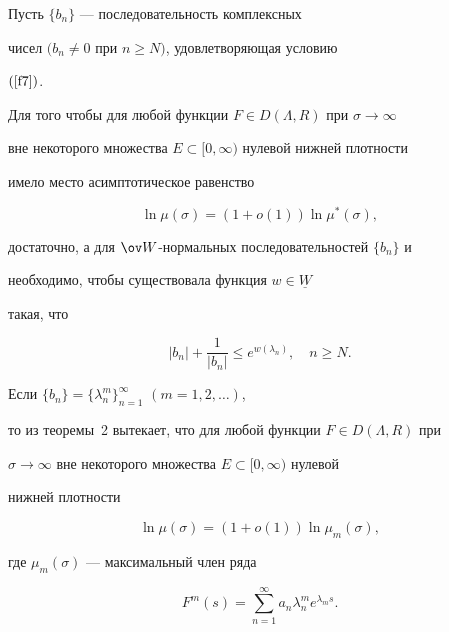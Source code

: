 \begin{thm}


Пусть $\{b_{n}\}$ --- последовательность комплексных


чисел $(b_{n}\neq0$ при $n\geq N)$, удовлетворяющая условию


$(\ref{f7})$.





Для того чтобы для любой функции $F\in D(\Lambda,R)$ при $\sigma\to\infty$


вне некоторого множества $E\subset[0,\infty)$ нулевой нижней плотности


имело место асимптотическое равенство


$$


\ln \mu(\sigma)=(1+o(1))\ln\mu^{*}(\sigma),


$$


достаточно, а для $\ov W$-нормальных последовательностей $\{b_n\}$ и


необходимо, чтобы существовала функция $w\in\underline{W}$


такая, что


\begin{equation}\label{f21}


|b_{n}|+\frac{1}{|b_{n}|}\leq e^{w(\lambda_{n})}, \quad n\geq N.


\end{equation}


\end{thm}








\begin{note}


Если $\{b_{n}\}=\{\lambda_{n}^{m}\}_{n=1}^{\infty}$ $(m=1,2,\dotsc)$,


то из теоремы~2 вытекает, что для любой функции $F\in D(\Lambda,R)$ при


$\sigma\to\infty$ вне некоторого множества $E\subset[0,\infty)$ нулевой


нижней плотности


$$


\ln \mu(\sigma)=(1+o(1))\ln \mu_{m}(\sigma),


$$


где $\mu_{m}(\sigma)$ --- максимальный член ряда


$$


F^{m}(s)=\sum_{n=1}^{\infty}a_{n}\lambda_{n}^{m}e^{\lambda_{m}s}.


$$


\end{note}





